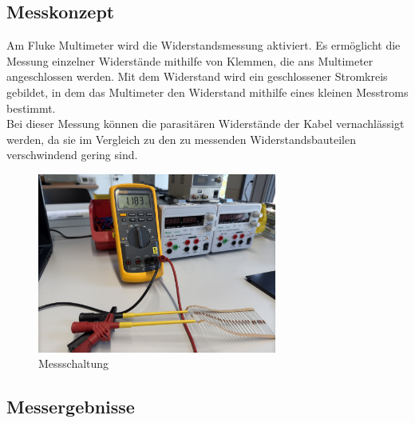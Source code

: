 \documentclass[a4paper,12pt]{article}
\begin{document}
\subsection{Messkonzept}
Am Fluke Multimeter wird die Widerstandsmessung aktiviert. Es ermöglicht die Messung einzelner Widerstände mithilfe von Klemmen, die ans Multimeter angeschlossen werden. Mit dem Widerstand wird ein geschlossener Stromkreis gebildet, in dem das Multimeter den Widerstand mithilfe eines kleinen Messtroms bestimmt.\\
\noindent Bei dieser Messung können die parasitären Widerstände der Kabel vernachlässigt werden, da sie im Vergleich zu den zu messenden Widerstandsbauteilen verschwindend gering sind.

\begin{figure}[H]
    \centering
    \includegraphics[width=0.7\textwidth]{../Quellen/Labor2/Fotos/IMG_4011.jpeg}
\caption{Messschaltung}
\end{figure}

\newpage
\subsection{Messergebnisse}
\end{document}
